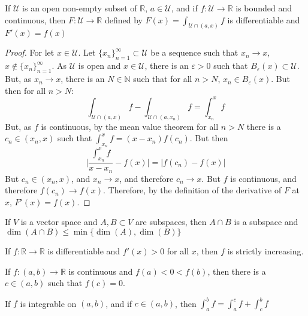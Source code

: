 \documentclass[crop=false,class=book]{standalone}
\begin{document}
        \begin{theorem*}
            If $\mathcal{U}$ is an open non-empty subset of
            $\mathbb{R}$, $a\in\mathcal{U}$, and if
            $f:\mathcal{U}\rightarrow\mathbb{R}$
            is bounded and continuous, then
            $F:\mathcal{U}\rightarrow\mathbb{R}$
            defined by $F(x)=\int_{\mathcal{U}\cap (a,x)}f$ is
            differentiable and $F'(x)=f(x)$
        \end{theorem*}
        \begin{proof}
            For let $x\in\mathcal{U}$. Let
            $\{x_n\}_{n=1}^{\infty}\subset\mathcal{U}$
            be a sequence such that $x_{n}\rightarrow x$,
            $x\notin\{x_{n}\}_{n=1}^{\infty}$.
            As $\mathcal{U}$ is open and $x\in\mathcal{U}$,
            there is an $\varepsilon>0$ such that
            $B_{\varepsilon}(x)\subset\mathcal{U}$. But, as
            $x_{n}\rightarrow x$, there is an $N\in \mathbb{N}$ such
            that for all $n>N$, $x_{n}\in B_{\varepsilon}(x)$.
            But then for all $n>N$:
            \begin{equation*}
                \int_{\mathcal{U}\cap(a,x)}f-%
                \int_{\mathcal{U}\cap(a,x_{n})}f=%
                \int_{x_{n}}^{x}f
            \end{equation*}
            But, as $f$ is continuous, by the mean value theorem for
            all $n>N$ there is a $c_{n}\in(x_n,x)$ such that
            $\int_{x_{n}}^{x}f=(x-x_{n})f(c_{n})$. But then 
            \begin{equation*}
                \Big|\frac{\int_{x_{n}}^{x}f}{x-x_{n}}-f(x)\Big|
                =|f(c_{n})-f(x)|
            \end{equation*}
            But $c_{n}\in(x_{n},x)$, and $x_{n}\rightarrow x$, and
            therefore $c_{n} \rightarrow x$. But $f$ is continuous,
            and therefore $f(c_{n})\rightarrow f(x)$. Therefore, by
            the definition of the derivative of $F$ at $x$,
            $F'(x)=f(x)$. 
        \end{proof}
        \begin{theorem*}
            If $V$ is a vector space and $A,B\subset V$ are
            subspaces, then $A\cap B$ is a subspace and
            $\dim(A\cap B)\leq\min\{\dim(A),\dim(B)\}$
        \end{theorem*}
        \begin{theorem*}
            If $f:\mathbb{R}\rightarrow \mathbb{R}$ is differentiable
            and $f'(x)>0$ for all $x$,
            then $f$ is strictly increasing.
        \end{theorem*}
        \begin{theorem*}
            If $f:(a,b)\rightarrow\mathbb{R}$ is continuous and
            $f(a)<0<f(b)$, then there is a $c\in (a,b)$ such that
            $f(c)=0$.
        \end{theorem*}
        \begin{theorem*}
            If $f$ is integrable on $(a,b)$, and if $c\in(a,b)$, then
            $\int_{a}^{b}f=\int_{a}^{c}f+\int_{c}^{b}f$
        \end{theorem*}
\end{document}
